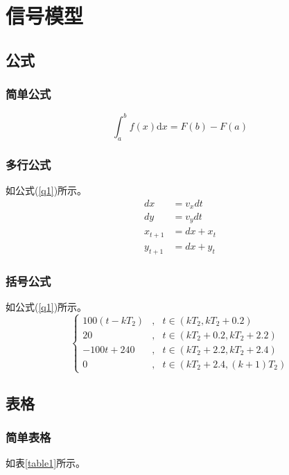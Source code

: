 \documentclass{nwputhesis}
\begin{document}
\makespace
\section{信号模型}
\subsection{公式}
\subsubsection{简单公式}
\begin{equation}
    \int_a^b f(x)\mathrm{d}x=F(b)-F(a)
\end{equation}

\subsubsection{多行公式}
如公式(\ref{q1})所示。
\begin{equation}
    \label{q1}
    \begin{aligned}
        dx      & =v_{x}dt  \\
        dy      & =v_{y}dt  \\
        x_{t+1} & =dx+x_{t} \\
        y_{t+1} & =dx+y_{t}
    \end{aligned}
\end{equation}

\subsubsection{括号公式}
如公式(\ref{q1})所示。
\begin{equation}
    \left\{
    \begin{aligned}
        100(t-kT_{2}) & , & t\in (kT_{2}, kT_{2}+0.2 )    \\
        20            & , & t\in (kT_{2}+0.2,kT_{2}+2.2)  \\
        -100t+240     & , & t\in( kT_{2}+2.2, kT_{2}+2.4) \\
        0             & , & t\in (kT_{2}+2.4,(k+1)T_{2})
    \end{aligned}
    \right.
\end{equation}

\subsection{表格}
\subsubsection{简单表格}
如表\ref{table1}所示。
\end{document}
